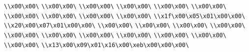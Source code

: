 \verb|\\x00\x00\|\newline
\verb|\\x00\x00\|\newline
\verb|\\x00\x00\|\newline
\verb|\\x00\x00\|\newline
\verb|\\x00\x00\|\newline
\verb|\\x00\x00\|\newline
\verb|\\x00\x00\|\newline
\verb|\\x00\x00\|\newline
\verb|\\x00\x00\|\newline
\verb|\\x00\x00\|\newline
\verb|\\x1f\x00\x05\x01\x00\x00\|\newline
\verb|\\x20\x00\x07\x01\x00\x00\|\newline
\verb|\\x00\x00\|\newline
\verb|\\x00\x00\|\newline
\verb|\\x00\x00\|\newline
\verb|\\x00\x00\|\newline
\verb|\\x00\x00\|\newline
\verb|\\x00\x00\|\newline
\verb|\\x00\x00\|\newline
\verb|\\x00\x00\|\newline
\verb|\\x00\x00\|\newline
\verb|\\x00\x00\|\newline
\verb|\\x00\x00\|\newline
\verb|\\x13\x00\x09\x01\x16\x00\xeb\x00\x00\x00\|\newline
